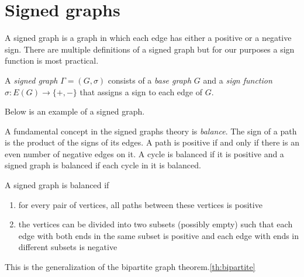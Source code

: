 \section{Signed graphs}

A signed graph is a graph in which each edge has either a positive or a negative sign. There are multiple definitions of a signed graph but for our purposes a sign function is most practical.

\begin{definition}
    A \textit{signed graph} $\Gamma = (G, \sigma)$ consists of a \textit{base graph} $G$ and a \textit{sign function} $\sigma : E(G) \rightarrow \{+,-\}$ that assigns a sign to each edge of $G$.
\end{definition}

Below is an example of a signed graph.

\begin{figure}[h]
    \centering
\end{figure}

A fundamental concept in the signed graphs theory is \textit{balance}. The sign of a path is the product of the signs of its edges. A path is positive if and only if there is an even number of negative edges on it. A cycle is balanced if it is positive and a signed graph is balanced if each cycle in it is balanced\cite{harary}.

\begin{theorem}[Harary]\label{th:harary}
    A signed graph is balanced if
    \begin{enumerate}
        \item for every pair of vertices, all paths between these vertices is positive
        \item the vertices can be divided into two subsets (possibly empty) such that each edge with both ends in the same subset is positive and each edge with ends in different subsets is negative
    \end{enumerate}

    This is the generalization of the bipartite graph theorem.\cref{th:bipartite}
\end{theorem}

